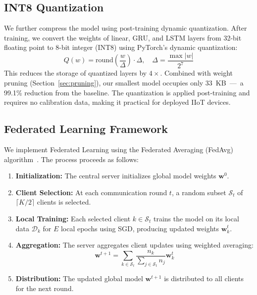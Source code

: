 \documentclass[a4paper,fleqn]{cas-sc}
\begin{document}
\subsection{INT8 Quantization}
\label{sec:quantization}

We further compress the model using post-training dynamic quantization. After training, we convert the weights of linear, GRU, and LSTM layers from 32-bit floating point to 8-bit integer (INT8) using PyTorch's dynamic quantization:
\begin{equation}
Q(w) = \text{round}\left(\frac{w}{\Delta}\right) \cdot \Delta, \quad \Delta = \frac{\max|w|}{2^{7}}
\label{eq:quant}
\end{equation}
This reduces the storage of quantized layers by $4\times$. Combined with weight pruning (Section~\ref{sec:pruning}), our smallest model occupies only 33~KB~---~a 99.1\% reduction from the baseline. The quantization is applied post-training and requires no calibration data, making it practical for deployed IIoT devices.

\subsection{Federated Learning Framework}
\label{sec:fl}

We implement Federated Learning using the Federated Averaging (FedAvg) algorithm~\cite{mcmahan2017communication}. The process proceeds as follows:
\begin{enumerate}
    \item \textbf{Initialization:} The central server initializes global model weights $\mathbf{w}^0$.
    \item \textbf{Client Selection:} At each communication round $t$, a random subset $\mathcal{S}_t$ of $\lceil K/2 \rceil$ clients is selected.
    \item \textbf{Local Training:} Each selected client $k \in \mathcal{S}_t$ trains the model on its local data $\mathcal{D}_k$ for $E$ local epochs using SGD, producing updated weights $\mathbf{w}_k^{t}$.
    \item \textbf{Aggregation:} The server aggregates client updates using weighted averaging:
    \begin{equation}
    \mathbf{w}^{t+1} = \sum_{k \in \mathcal{S}_t} \frac{n_k}{\sum_{j \in \mathcal{S}_t} n_j} \mathbf{w}_k^t
    \label{eq:fedavg}
    \end{equation}
    \item \textbf{Distribution:} The updated global model $\mathbf{w}^{t+1}$ is distributed to all clients for the next round.
\end{enumerate}
\end{document}
